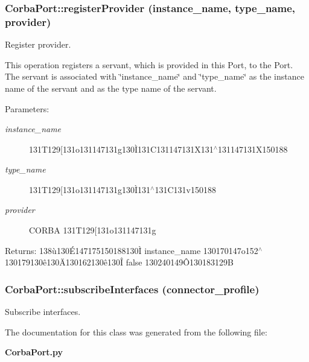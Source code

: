 \subsubsection{\setlength{\rightskip}{0pt plus 5cm}Corba\-Port::register\-Provider (instance\_\-name, type\_\-name, provider)}\label{classCorbaPort_CorbaPorta2}


Register provider. 

This operation registers a servant, which is provided in this Port, to the Port. The servant is associated with \char`\"{}instance\_\-name\char`\"{} and \char`\"{}type\_\-name\char`\"{} as the instance name of the servant and as the type name of the servant. \begin{Desc}
\item[Parameters:]
\begin{description}
\item[{\em instance\_\-name}]131T129[131o131147131g130\`{I}131C131147131X131$^\wedge$131147131X150188 \item[{\em type\_\-name}]131T129[131o131147131g130\`{I}131$^\wedge$131C131v150188 \item[{\em provider}]CORBA 131T129[131o131147131g \end{description}
\end{Desc}
\begin{Desc}
\item[Returns:]138\`{u}130\'{E}147175150188130\`{I} instance\_\-name 130170147o152$^\wedge$130179130\^{e}130\"{A}130162130\^{e}130\^{I} false 130240149\^{O}130183129B\end{Desc}
\subsubsection{\setlength{\rightskip}{0pt plus 5cm}Corba\-Port::subscribe\-Interfaces (connector\_\-profile)}\label{classCorbaPort_CorbaPorta5}


Subscribe interfaces. 



The documentation for this class was generated from the following file:\begin{CompactItemize}
\item 
{\bf Corba\-Port.py}\end{CompactItemize}
